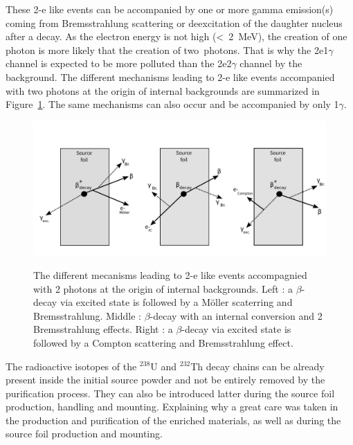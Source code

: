 \documentclass[main.tex]{subfiles}
\begin{document}
\NI These 2-e like events can be accompanied by one or more gamma emission(s) coming from Bremsstrahlung scattering or deexcitation of the  daughter nucleus after a decay. As the electron energy is not high (<~2~MeV), the creation of one photon is more likely that the creation of two~photons. That is why the 2e1$\gamma$ channel is expected to be more polluted than the 2e2$\gamma$ channel by the background. The different mechanisms leading to 2-e like events accompanied with two photons at the origin of internal backgrounds are summarized in Figure~\ref{InternalBkgPicture}. The same mechanisms can also occur and be accompanied by only 1$\gamma$.



\begin{figure}[h!]
\centering
\includegraphics[scale=0.48]{pictures/Chap6/InternalBkg.pdf}
\label{InternalBkgPicture}
\caption{The different mecanisms leading to 2-e like events accompagnied with 2 photons at the origin of internal backgrounds. Left : a $\beta$-decay via excited state is followed by a M\"oller scaterring and Bremsstrahlung. Middle : $\beta$-decay with an internal conversion and 2 Bremsstrahlung effects. Right :  a $\beta$-decay via excited state is followed by a Compton scattering and Bremsstrahlung effect.}
\end{figure}


\bigskip


\NI The radioactive isotopes of the $^{\text{238}}$U and $^{\text{232}}$Th decay chains can be already present inside the initial source powder and not be entirely removed by the purification process. They can also be introduced latter during the source foil production, handling and mounting. Explaining why a great care was taken in the production and purification of the enriched materials, as well as during the source foil production and mounting.


\bigskip
\end{document}
